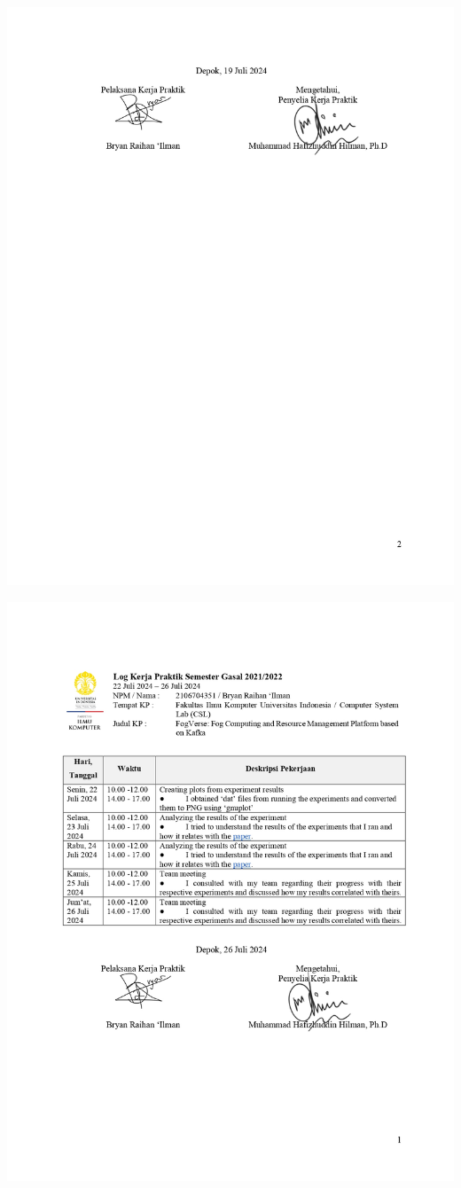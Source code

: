 \includegraphics[width=1\textwidth]{assets/pics/Log-7-CSL-Bryan Raihan Ilman-0002.jpg}

\includegraphics[width=1\textwidth]{assets/pics/Log-8-CSL-Bryan Raihan Ilman-0001.jpg}

